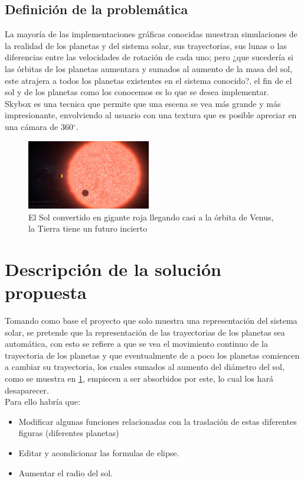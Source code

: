 \documentclass[12pt,journal,compsoc]{IEEEtran}
\begin{document}
\subsection{Definición de la problemática}
La mayoría de las implementaciones gráficas conocidas muestran simulaciones de la realidad de los planetas y del sistema solar, sus trayectorias, sus lunas o las diferencias entre las velocidades de rotación de cada uno; pero ¿que sucedería si las órbitas de los planetas aumentara y sumados al aumento de la masa del sol, este atrajera a todos los planetas existentes en el sistema conocido?, el fin de el sol y de los planetas como los conocemos es lo que se desea implementar.\\
Skybox es una tecnica que permite que una escena se vea más grande y más impresionante, envolviendo al usuario con una textura que es posible apreciar en una cámara de 360$^{\circ}$\cite{skybox2}.
\begin{figure}[h!]
  \includegraphics[width=0.48\textwidth]{sol.jpg}
  \caption{El Sol convertido en gigante roja llegando casi a la órbita de Venus, la Tierra tiene un futuro incierto}
  \captionsetup{justification=centering}
  \label{muerte}
\end{figure}
\section{Descripción de la solución propuesta}
Tomando como base el proyecto que solo muestra una representación del sistema solar, se pretende que la representación de las trayectorias de los planetas sea automática, con esto se refiere a que se vea el movimiento continuo de la trayectoria de los planetas y que eventualmente de a poco los planetas comiencen a cambiar su trayectoria, los cuales sumados al aumento del diámetro del sol, como se muestra en \ref{muerte}, empiecen a ser absorbidos por este, lo cual los hará desaparecer\cite{far}.\\
Para ello habría que:
\begin{itemize}
 \item Modificar algunas funciones relacionadas con la traslación de estas diferentes figuras (diferentes planetas)
 \item Editar y acondicionar las formulas de elipse.
 \item Aumentar el radio del sol.
\end{itemize}   %
\end{document}
